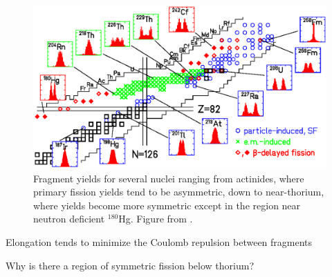 \begin{figure}
	\includegraphics[width=0.9\linewidth]{./TeX_files/with180Hg}
	\caption[Short]{Fragment yields for several nuclei ranging from actinides, where primary fission yields tend to be asymmetric, down to near-thorium, where yields become more symmetric except in the region near neutron deficient $^{180}$Hg. Figure from \cite{Andreyev2010}.}
	\label{fig:with180hg}
\end{figure}

Elongation tends to minimize the Coulomb repulsion between fragments

Why is there a region of symmetric fission below thorium?